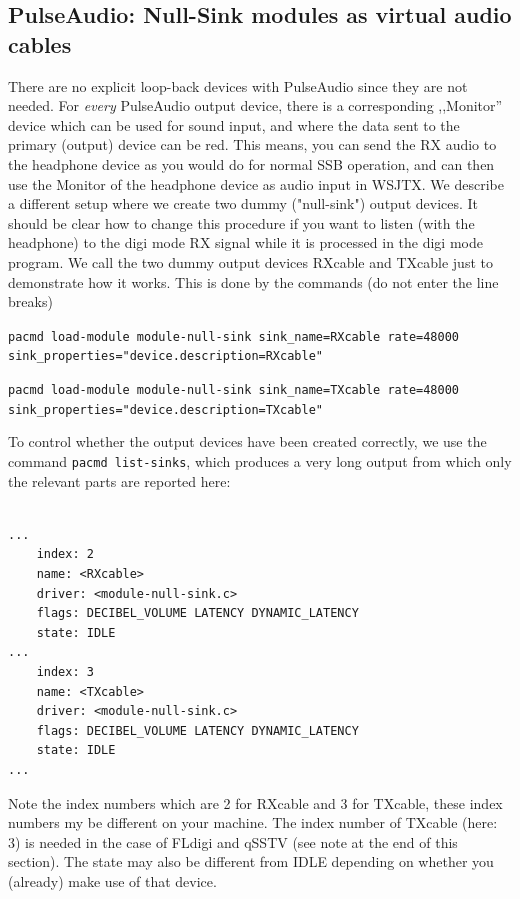 \documentclass[12pt]{book}
\begin{document}
\subsection[PulseAudio: NullSink modules]{PulseAudio: Null-Sink modules as virtual audio cables}
There are no explicit loop-back devices with PulseAudio since they are not needed.
For \textit{every} PulseAudio output device, there is a corresponding ,,Monitor'' device
which can be used for sound input, and where the data sent to the primary (output) device
can be red. This means, you can send the RX audio to the headphone device as you would do
for normal SSB operation, and can then use the Monitor of the headphone device as audio
input in WSJTX. We describe a different setup where we create two dummy
 ("null-sink") output devices. It should be clear how to change this procedure if
 you want to listen (with the headphone) to the digi mode RX signal while it is processed
 in the digi mode program.  We call the two dummy output devices
 RXcable and TXcable just to demonstrate how it works.
  This is done by the commands (do not enter the line breaks)

\texttt{pacmd load-module module-null-sink sink\_name=RXcable rate=48000 \\
sink\_properties="device.description=RXcable"
}

\texttt{pacmd load-module module-null-sink sink\_name=TXcable rate=48000 \\
sink\_properties="device.description=TXcable"
}

To control whether the output devices have been created correctly, we use the command
\texttt{pacmd list-sinks}, which produces
a very long output from which only the relevant parts are reported here:

\begin{small}
\begin{verbatim}

...
    index: 2
	name: <RXcable>
	driver: <module-null-sink.c>
	flags: DECIBEL_VOLUME LATENCY DYNAMIC_LATENCY
	state: IDLE
...
    index: 3
	name: <TXcable>
	driver: <module-null-sink.c>
	flags: DECIBEL_VOLUME LATENCY DYNAMIC_LATENCY
	state: IDLE
...
\end{verbatim}
\end{small}

Note the index numbers which are 2 for RXcable and 3 for TXcable, these index numbers my
be different on your machine. The index number of TXcable (here: 3) is needed in the
case of FLdigi and qSSTV (see note at the end of this section).
The state may also be different from IDLE depending on whether
you (already) make use of that device.
\end{document}
